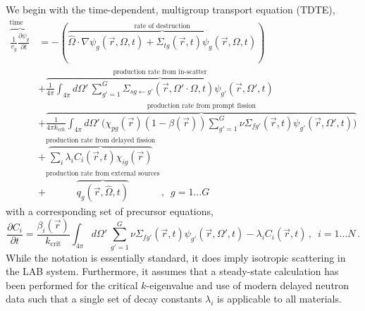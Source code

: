 We begin with the time-dependent, multigroup transport equation (TDTE),
\begin{equation}
\begin{split}
\overbrace{ \frac{1}{v_g} \frac{\partial \psi_g}{\partial t} }^{\text{time rate of change}} &=  
    - (\overbrace{ \hat{\Omega} \cdot \nabla \psi_g(\vec{r},\Omega,t) + 
                   \Sigma_{tg}(\vec{r},t)  \psi_g(\vec{r},\Omega,t) }^
                 {\text{rate of destruction}} ) \\ 
    &+ \overbrace{\frac{1}{4\pi} \int_{4\pi}d\Omega' \, \sum_{g'=1}^{G} 
                  \Sigma_{sg \gets g'}(\vec{r},\Omega' \cdot \Omega,t) \psi_{g'}(\vec{r},\Omega',t)}^
                 {\text{production rate from in-scatter}} \\
    &+ \overbrace{\frac{1}{4\pi k_{\text{crit}} }  \int_{4\pi}d\Omega' \, 
                    \Bigg ( 
                       \chi_{pg}(\vec{r})(1-\beta(\vec{r})) \sum_{g'=1}^{G} 
                       \nu\Sigma_{fg'}(\vec{r},t)  \psi_{g'}(\vec{r},\Omega',t) 
                    \Bigg )}^
                 {\text{production rate from prompt fission}} \\
    &+ \overbrace{\sum_i \lambda_i C_i(\vec{r}, t) \chi_{ig}(\vec{r})}^
                 {\text{production rate from delayed fission}} \\
    &+ \overbrace{q_g(\vec{r}, \hat{\Omega}, t)}^
                 {\text{production rate from external sources}}\, ,  \,\,\, g = 1 \ldots G
\end{split}
\label{eq:tdte}
\end{equation}
with a corresponding set of precursor equations,
\begin{equation}
 \frac{\partial C_i}{\partial t} =  
   \frac{\beta_i(\vec{r})}{k_{\text{crit}}} \int_{4\pi}d\Omega' \,  
     \sum_{g'=1}^{G} \nu\Sigma_{fg'}(\vec{r},t)  
       \psi_{g'}(\vec{r},\Omega',t) 
  - \lambda_i C_i(\vec{r},t) \, , \,\,\, i = 1\ldots N \, .
\label{eq:prec}
\end{equation}
While the notation is essentially standard, it does imply 
isotropic scattering in the LAB system.  Furthermore, it
assumes that 
a steady-state calculation has been performed for the critical 
$k$-eigenvalue and
use of modern delayed neutron data such that a single set of 
decay constants $\lambda_i$ is applicable to all materials.


